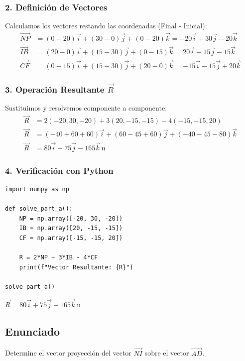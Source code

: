 \documentclass[12pt, a4paper]{article}
\begin{document}
\subsubsection*{2. Definición de Vectores}
Calculamos los vectores restando las coordenadas (Final - Inicial):
\begin{align*}
    \vec{NP} &= (0-20)\vec{i} + (30-0)\vec{j} + (0-20)\vec{k} = -20\vec{i} + 30\vec{j} - 20\vec{k} \\
    \vec{IB} &= (20-0)\vec{i} + (15-30)\vec{j} + (0-15)\vec{k} = 20\vec{i} - 15\vec{j} - 15\vec{k} \\
    \vec{CF} &= (0-15)\vec{i} + (15-30)\vec{j} + (20-0)\vec{k} = -15\vec{i} - 15\vec{j} + 20\vec{k}
\end{align*}

\subsubsection*{3. Operación Resultante $\vec{R}$}
Sustituimos y resolvemos componente a componente:
\begin{align*}
    \vec{R} &= 2(-20, 30, -20) + 3(20, -15, -15) - 4(-15, -15, 20) \\
    \vec{R} &= (-40+60+60)\vec{i} + (60-45+60)\vec{j} + (-40-45-80)\vec{k} \\
    \vec{R} &= 80\vec{i} + 75\vec{j} - 165\vec{k} \, \text{u}
\end{align*}

\subsubsection*{4. Verificación con Python}
\begin{lstlisting}
import numpy as np

def solve_part_a():
    NP = np.array([-20, 30, -20])
    IB = np.array([20, -15, -15])
    CF = np.array([-15, -15, 20])
    
    R = 2*NP + 3*IB - 4*CF
    print(f"Vector Resultante: {R}")

solve_part_a()
\end{lstlisting}

\begin{tcolorbox}[colback=green!5!white, colframe=green!50!black, title=Respuesta Final]
\centering \Large $\vec{R} = 80\vec{i} + 75\vec{j} - 165\vec{k} \, \text{u}$
\end{tcolorbox}

\newpage

\subsection*{Enunciado}
Determine el vector proyección del vector $\vec{NI}$ sobre el vector $\vec{AD}$.
\end{document}

